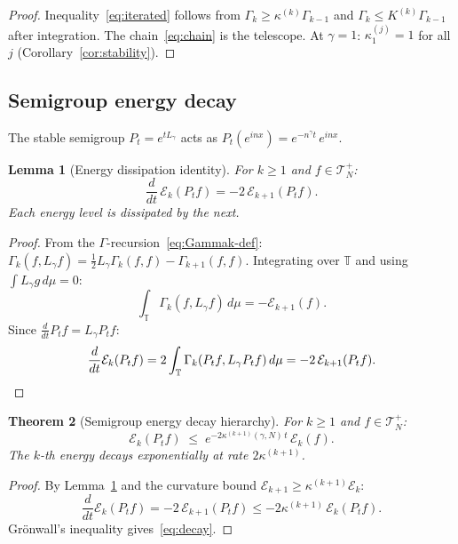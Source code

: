\documentclass[11pt,a4paper]{article}
\theoremstyle{plain}
\newtheorem{theorem}{Theorem}[section]
\newtheorem{lemma}[theorem]{Lemma}
\theoremstyle{definition}
\theoremstyle{remark}
\newcommand{\T}{\mathbb{T}}
\begin{document}
\begin{proof}
Inequality~\eqref{eq:iterated} follows from
$\Gamma_k \geq \kappa^{(k)}\Gamma_{k-1}$ and
$\Gamma_k \leq K^{(k)}\Gamma_{k-1}$ after integration.
The chain~\eqref{eq:chain} is the telescope.
At $\gamma = 1$: $\kappa_1^{(j)} = 1$ for all $j$
(Corollary~\ref{cor:stability}).
\end{proof}


\subsection{Semigroup energy decay}

The stable semigroup $P_t = e^{tL_\gamma}$ acts as
$P_t(e^{inx}) = e^{-n^\gamma t}\,e^{inx}$.

\begin{lemma}[Energy dissipation identity]
\label{lem:dissipation}
For $k \geq 1$ and $f \in \mathcal{T}_N^+$:
\begin{equation}\label{eq:dissipation}
  \frac{d}{dt}\,\mathcal{E}_k(P_t f)
  = -2\,\mathcal{E}_{k+1}(P_t f).
\end{equation}
Each energy level is dissipated by the next.
\end{lemma}

\begin{proof}
From the $\Gamma$-recursion~\eqref{eq:Gammak-def}:
$\Gamma_k(f, L_\gamma f) =
\frac{1}{2}L_\gamma\Gamma_k(f,f) - \Gamma_{k+1}(f,f)$.
Integrating over $\T$ and using
$\int L_\gamma g\,d\mu = 0$:
\[
  \int_\T \Gamma_k(f, L_\gamma f)\,d\mu
  = -\mathcal{E}_{k+1}(f).
\]
Since $\frac{d}{dt}P_t f = L_\gamma P_t f$:
\[
  \frac{d}{dt}\mathcal{E}_k(P_t f)
  = 2\int_\T \Gamma_k(P_t f, L_\gamma P_t f)\,d\mu
  = -2\,\mathcal{E}_{k+1}(P_t f).
  \qedhere
\]
\end{proof}

\begin{theorem}[Semigroup energy decay hierarchy]
\label{thm:decay}
For $k \geq 1$ and $f \in \mathcal{T}_N^+$:
\begin{equation}\label{eq:decay}
  \mathcal{E}_k(P_t f)
  \;\leq\; e^{-2\kappa^{(k+1)}(\gamma,N)\,t}\,
  \mathcal{E}_k(f).
\end{equation}
The $k$-th energy decays exponentially at rate
$2\kappa^{(k+1)}$.
\end{theorem}

\begin{proof}
By Lemma~\ref{lem:dissipation} and the curvature bound
$\mathcal{E}_{k+1} \geq \kappa^{(k+1)}\mathcal{E}_k$:
\[
  \frac{d}{dt}\mathcal{E}_k(P_t f)
  = -2\,\mathcal{E}_{k+1}(P_t f)
  \leq -2\kappa^{(k+1)}\,\mathcal{E}_k(P_t f).
\]
Gr\"onwall's inequality gives~\eqref{eq:decay}.
\end{proof}
\end{document}
